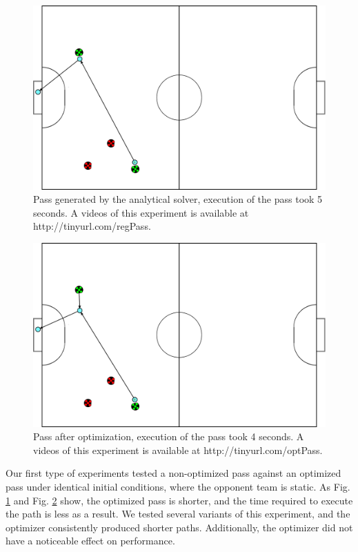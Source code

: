 \documentclass[a4paper, 10pt, conference]{ieeeconf}      %
\begin{document}
\begin{figure}[ht!]
\begin{center}
\includegraphics[totalheight=1.6in]{nonoptimized_plan}
\end{center}
\caption{Pass generated by the analytical solver, execution of the pass took 5 seconds. A videos of this experiment is available at http://tinyurl.com/regPass.}
\label{experiment1fig1}
\end{figure}

\begin{figure}[ht!]
\begin{center}
\includegraphics[totalheight=1.6in]{optimized_plan}
\end{center}
\caption{Pass after optimization, execution of the pass took 4 seconds. A videos of this experiment is available at http://tinyurl.com/optPass.}
\label{experiment1fig2}
\end{figure}

Our first type of experiments tested a non-optimized pass against an optimized pass under identical initial conditions, where the opponent team is static. As Fig. \ref{experiment1fig1} and Fig. \ref{experiment1fig2} show, the optimized pass is shorter, and the time required to execute the path is less as a result. We tested several variants of this experiment, and the optimizer consistently produced shorter paths. Additionally, the optimizer did not have a noticeable effect on performance.
\end{document}
